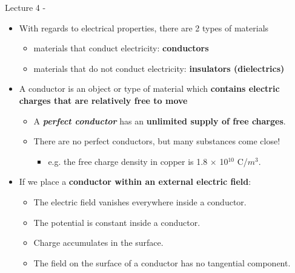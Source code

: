 
\renewcommand{\summarizedlecture}{4 }

%
%
%

\begin{frame}{Lecture \summarizedlecture - \lecturesummarytitle}

\begin{itemize}

  \item With regards to electrical properties, there are 2 types of materials
   \begin{itemize}
     \item materials that conduct electricity: {\bf conductors}
     \item materials that do not conduct electricity: {\bf insulators (dielectrics)}
   \end{itemize}

   \vspace{0.2cm}

   \item A conductor is an object or type of material
         which {\bf contains electric charges that are relatively free to move}
  \begin{itemize}
     \item A {\em \bf perfect conductor} has an {\bf unlimited supply of free charges}.
     \item There are no perfect conductors, but many substances come close!
      \begin{itemize}
           \item e.g. the free charge density in copper is 1.8 $\times$ 10$^{10}$ C/$m^3$.
      \end{itemize}
   \end{itemize}

   \vspace{0.2cm}

   \item If we place a {\bf conductor within an external electric field}:
     \begin{itemize}
       \item The electric field vanishes everywhere inside a conductor.
       \item The potential is constant inside a conductor.
       \item Charge accumulates in the surface.
       \item The field on the surface of a conductor has no tangential component.
     \end{itemize}

\end{itemize}

\end{frame}


